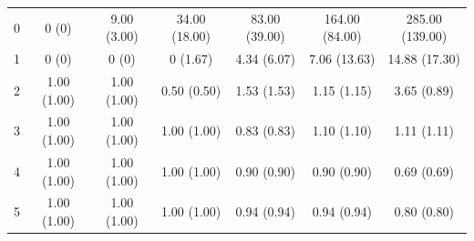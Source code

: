 \begin{table}[H]
\begin{centering}
{\begin{centering}
\begin{tabular*}{1\columnwidth}{@{\extracolsep{\fill}}ccccccc}
\midrule
\multicolumn{1}{c}{{\footnotesize{}0}} & {\footnotesize{}0 (0)} & {\footnotesize{}9.00 (3.00)} & {\footnotesize{}34.00 (18.00)} & {\footnotesize{}83.00 (39.00)} & {\footnotesize{}164.00 (84.00)} & {\footnotesize{}285.00 (139.00)}\tabularnewline
\multicolumn{1}{c}{{\footnotesize{}1}} & {\footnotesize{}0 (0)} & {\footnotesize{}0 (0)} & {\footnotesize{}0 (1.67)} & {\footnotesize{}4.34 (6.07)} & {\footnotesize{}7.06 (13.63)} & {\footnotesize{}14.88 (17.30)}\tabularnewline
\multicolumn{1}{c}{{\footnotesize{}2}} & {\footnotesize{}1.00 (1.00)} & {\footnotesize{}1.00 (1.00)} & {\footnotesize{}0.50 (0.50)} & {\footnotesize{}1.53 (1.53)} & {\footnotesize{}1.15 (1.15)} & {\footnotesize{}3.65 (0.89)}\tabularnewline
{\footnotesize{}3} & {\footnotesize{}1.00 (1.00)} & {\footnotesize{}1.00 (1.00)} & {\footnotesize{}1.00 (1.00)} & {\footnotesize{}0.83 (0.83)} & {\footnotesize{}1.10 (1.10)} & {\footnotesize{}1.11 (1.11)}\tabularnewline
\multicolumn{1}{c}{{\footnotesize{}4}} & {\footnotesize{}1.00 (1.00)} & {\footnotesize{}1.00 (1.00)} & {\footnotesize{}1.00 (1.00)} & {\footnotesize{}0.90 (0.90)} & {\footnotesize{}0.90 (0.90)} & {\footnotesize{}0.69 (0.69)}\tabularnewline
\multicolumn{1}{c}{{\footnotesize{}5}} & {\footnotesize{}1.00 (1.00)} & {\footnotesize{}1.00 (1.00)} & {\footnotesize{}1.00 (1.00)} & {\footnotesize{}0.94 (0.94)} & {\footnotesize{}0.94 (0.94)} & {\footnotesize{}0.80 (0.80)}\tabularnewline
\bottomrule
\end{tabular*}
\par\end{centering}
}
\par\end{centering}
\begin{centering}
\end{centering}
\end{table}
